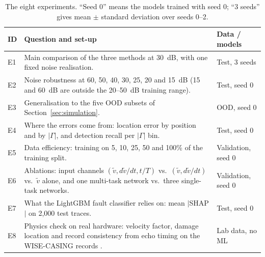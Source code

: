 \begin{table}[!htbp]
\centering
\caption{The eight experiments. ``Seed 0'' means the models trained with seed 0; ``3 seeds'' gives mean $\pm$ standard deviation over seeds 0--2.}
\label{tab:experiments}
\small
\renewcommand{\arraystretch}{1.2}
\begin{tabular}{@{}l p{} l@{}}
\toprule
\textbf{ID} & \textbf{Question and set-up} & \textbf{Data / models} \\
\midrule
E1 & Main comparison of the three methods at 30~dB, with one fixed noise realisation. & Test, 3 seeds \\
E2 & Noise robustness at 60, 50, 40, 30, 25, 20 and 15~dB (15 and 60~dB are outside the 20--50~dB training range). & Test, seed 0 \\
E3 & Generalisation to the five OOD subsets of Section~\ref{sec:simulation}. & OOD, seed 0 \\
E4 & Where the errors come from: location error by position and by $|\Gamma|$, and detection recall per $|\Gamma|$ bin. & Test, seed 0 \\
E5 & Data efficiency: training on 5, 10, 25, 50 and 100\% of the training split. & Validation, seed 0 \\
E6 & Ablations: input channels $(\tilde v, d\tilde v/dt, t/T)$ vs.\ $(\tilde v, d\tilde v/dt)$ vs.\ $\tilde v$ alone, and one multi-task network vs.\ three single-task networks. & Validation, seed 0 \\
E7 & What the LightGBM fault classifier relies on: mean $|$SHAP$|$ \cite{lundberg2017unified} on 2,000 test traces. & Test, seed 0 \\
E8 & Physics check on real hardware: velocity factor, damage location and record consistency from echo timing on the WISE-CASING records \cite{nrel_wise_casing}. & Lab data, no ML \\
\bottomrule
\end{tabular}
\end{table}
